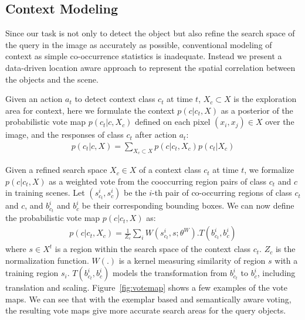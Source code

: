 


\subsection{Context Modeling}
\label{sec:context}
Since our task is not only to detect the object but also refine the search space of the query in the image as accurately as possible, conventional modeling of context as simple co-occurrence statistics is inadequate. Instead we present a data-driven location aware approach to represent the spatial correlation between the objects and the scene. 

Given an action $a_t$ to detect context class $c_t$ at time $t$, $X_c \subset X$ is the exploration area for context, here we formulate the context $p(c|c_t,X)$ as a posterior of the probabilistic vote map $p(c_t|c,X_c)$ defined on each pixel $(x_i,x_j)\in X$ over the image, and the responses of class $c_t$ after action $a_t$:
\begin{eqnarray}
p(c_t|c,X) = \sum_{X_c \subset X} p(c|c_t,X_c)p(c_t|X_c)
\end{eqnarray}

Given a refined search space $X_c\in X$ of a context class $c_t$ at time $t$, we formalize $p(c|c_t,X)$ as a weighted vote from the cooccurring region pairs of class $c_t$ and $c$ in training scenes. Let $(s_{c_t}^i, s_c^i)$ be the $i$-th pair of co-occurring regions of class $c_t$ and $c$, and $b_{c_t}^i$ and $b_c^i$ be their corresponding bounding boxes. We can now define the probabilistic vote map $p(c|c_t,X)$ as:
\begin{eqnarray}
\label{eq:votemap}
p(c|c_t,X_c) = \frac{1}{Z_c}\sum_i W(s_{c_t}^i,s;\theta^W).T(b_{c_t}^i,b_c^i)
\end{eqnarray}
where $s\in X^t$ is a region within the search space of the context class $c_t$. $Z_c$ is the normalization function. $W(.)$ is a kernel measuring similarity of region $s$ with a training region $s_i$. $T(b_{c_t}^i,b_c^i)$ models the transformation from $b_{c_t}^i$ to $b_c^i$, including translation and scaling. Figure~\ref{fig:votemap} shows a few examples of the vote maps. We can see that with the exemplar based and semantically aware voting, the resulting vote maps give more accurate search areas for the query objects.



